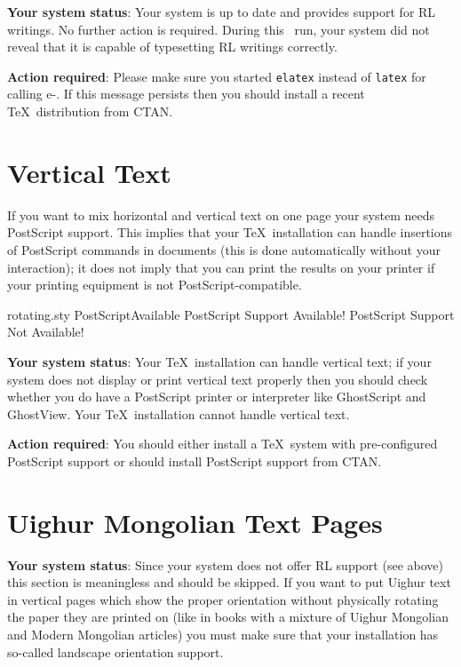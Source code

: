 \documentclass[a4paper,11pt]{article}
\begin{document}
\textbf{Your system status}:
\ifnum{}
	Your system is up to date and provides support for RL writings.
	No further action is required.
\else
	During this \LaTeXe\ run, your system did not reveal that it is
	capable of typesetting RL writings correctly.
	
	\textbf{Action required}:
	Please make sure
	\marginpar{\Huge!!!}
	you started \texttt{elatex} instead of \texttt{latex} for calling
	e-\LaTeXe. If this message persists then you should install a
	recent \TeX\ distribution from CTAN.
\fi


\section{Vertical Text\label{VerticalText}}

If you want to mix horizontal and vertical text on one page your
system needs PostScript support. This implies that your \TeX\ 
installation can handle insertions of PostScript commands in
documents (this is done automatically without your interaction);
it does not imply that you can print the results on your printer
if your printing equipment is not PostScript-compatible.

\PackageDiagnostics%
	{rotating.sty}				%
	{PostScriptAvailable}			%
	{PostScript Support Available!}		%
	{PostScript Support Not Available!}	%
	
\textbf{Your system status}:
\ifnum{}
	Your \TeX\ installation can handle vertical text; if your
	system does not display or print vertical text properly
	then you should check whether you do have a PostScript
	printer or interpreter like GhostScript and GhostView.
\else
	Your \TeX\ installation cannot handle vertical text.

	\textbf{Action required}:
	You should either install a \TeX\ system with pre-configured
	\marginpar{\Huge!!!}
	PostScript support or should install PostScript support
	from CTAN.
\fi
%

\section{Uighur Mongolian Text Pages}

\textbf{Your system status}:
\ifnum{}
	Since your system does not offer RL support (see above)
	this section is meaningless and should be skipped.
\else
	If you want to put Uighur text in vertical pages which
	show the proper orientation without physically rotating
	the paper they are printed on (like in books with a
	mixture of Uighur Mongolian and Modern Mongolian articles)
	you must make sure that your installation has so-called
	landscape orientation support.
\end{document}
